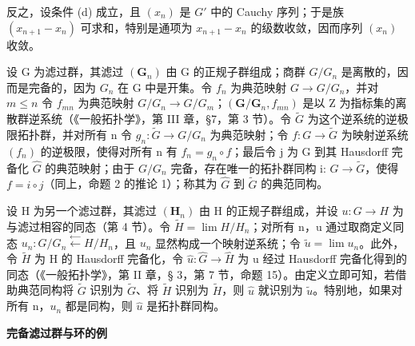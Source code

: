 反之，设条件 (d) 成立，且 \((x_{n})\) 是 \(G'\) 中的 Cauchy 序列；于是族 \((x_{n+1} - x_{n})\) 可求和，特别是通项为 \(x_{n+1} - x_{n}\) 的级数收敛，因而序列 \((x_{n})\) 收敛。

设 G 为滤过群，其滤过 \((\mathbf{G}_{n})\) 由 G 的正规子群组成；商群 \(G/G_{n}\) 是离散的，因而是完备的，因为 \(G_{n}\) 在 G 中是开集。令 \(f_{n}\) 为典范映射 \(G \to G/G_{n}\)，并对 \(m \leqslant n\) 令 \(f_{mn}\) 为典范映射 \(G/G_{n} \to G/G_{m}\)；\((\mathbf{G}/\mathbf{G}_{n}, f_{mn})\) 是以 Z 为指标集的离散群逆系统（《一般拓扑学》，第 III 章，§7，第 3 节）。令 \(\tilde{G}\) 为这个逆系统的逆极限拓扑群，并对所有 n 令 \(g_{n}: \tilde{G} \to G/G_{n}\) 为典范映射；令 \(f: G \to \tilde{G}\) 为映射逆系统 \((f_{n})\) 的逆极限，使得对所有 n 有 \(f_{n} = g_{n} \circ f\)；最后令 j 为 G 到其 Hausdorff 完备化 \(\hat{G}\) 的典范映射；由于 \(G/G_{n}\) 完备，存在唯一的拓扑群同构 i: \(\hat{G} \to \tilde{G}\)，使得 \(f = i \circ j\)（同上，命题 2 的推论 1）；称其为 \(\hat{G}\) 到 \(\tilde{G}\) 的典范同构。

设 H 为另一个滤过群，其滤过 \((\mathbf{H}_{n})\) 由 H 的正规子群组成，并设 \(u: G \to H\) 为与滤过相容的同态（第 4 节）。令 \(\tilde{H} = \lim H/H_{n}\)；对所有 n，u 通过取商定义同态 \(u_{n}: G/G_{n} \xleftarrow{\leftarrow} H/H_{n}\)，且 \(u_{n}\) 显然构成一个映射逆系统；令 \(\tilde{u} = \lim u_{n}\)。此外，令 \(\tilde{H}\) 为 H 的 Hausdorff 完备化，令 \(\hat{u}: \hat{G} \to \hat{H}\) 为 u 经过 Hausdorff 完备化得到的同态（《一般拓扑学》，第 II 章，§ 3，第 7 节，命题 15）。由定义立即可知，若借助典范同构将 \(\tilde{G}\) 识别为 \(\tilde{G}\)、将 \(\tilde{H}\) 识别为 \(\tilde{H}\)，则 \(\hat{u}\) 就识别为 \(\tilde{u}\)。特别地，如果对所有 n，\(u_{n}\) 都是同构，则 \(\hat{u}\) 是拓扑群同构。

\textbf{完备滤过群与环的例}\par

